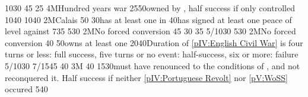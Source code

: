  
%
%
{10}{30}{\EU@objEcosseVassal}%
%
%
{}{45}{\EU@objCalaisANG}%
%
%
{}{25}{\EU@objIndustrial}%
%
\EUobjective4M{Hundred years war}{}%
{25}{50}{\provinceGuyenne owned by \paysmajeurAngleterre, half success if only
  controlled}%
%
%
{10}{40}{\EU@objIrelandPacified}%
%
%
%
{10}{40}{\EU@objEcosseVassal}%
%
\EUobjective2M{Calais}{}%
{}{50}{\EU@objCalaisANG}%
%
%
{}{30}{\paysmajeurAngleterre has at least one \COL in \continentAmerica}%
%
%
{}{40}{\paysmajeurAngleterre has signed at least one peace of level 
  against \paysmajeurFrance}%
%
%
{7}{35}{\EU@objIrelandPacified}%
%
%
%
{5}{30}{\EU@objEcosseVassal}%
%
\EUobjective2M{No forced conversion}{}%
{}{45}{}%
%
%
{}{30}{\EU@objIndustrial}%
%
%
%
{}{35}{}%
%
%
{5/10}{30}{}%
%
%
%
{5}{30}{\EU@objEcosseVassal}%
%
\EUobjective2M{No forced conversion}{}%
{}{40}{}%
%
%
{}{50}{\paysmajeurAngleterre owns at least one }%
%
%
{20}{40}{Duration of \ref{pIV:English Civil War} is four turns or less: full
  success, five turns or no event: half-success, six or more: failure}%
%
%
{5/10}{30}{}%
%
%
%
{7/15}{45}{}%
%
%
{}{40}{}%
%
\EUobjective3M{}{}%
{}{40}{}%
%
%
{15}{30}{\paysmajeurEspagne must have renounced to the conditions of
  , and not reconquered it. Half success
  if neither \ref{pIV:Portuguese Revolt} nor \ref{pV:WoSS} occured}%
%
%
{5}{40}{}%
%
